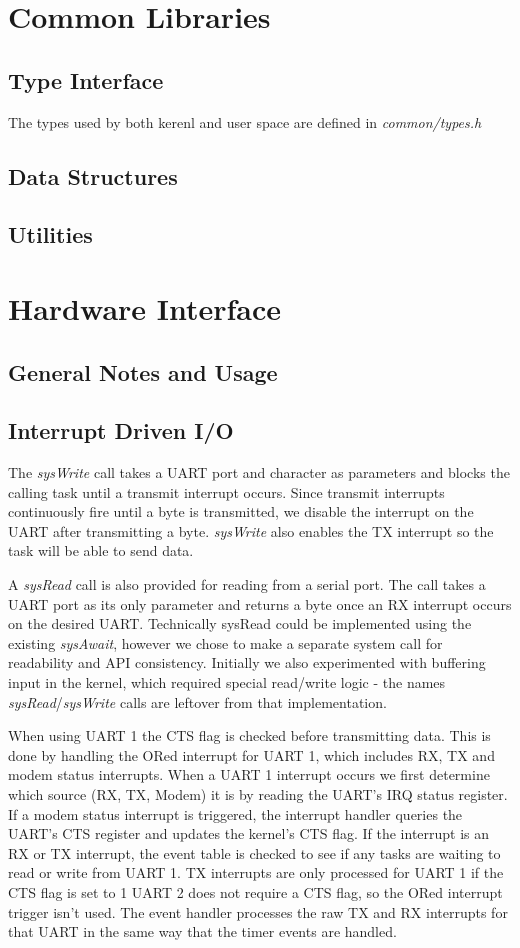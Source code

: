 \documentclass[twoside,a4paper]{refart}
\begin{document}
\section{Common Libraries}
\subsection{Type Interface}
The types used by both kerenl and user space are defined in \textit{common/types.h}
\subsection{Data Structures}
\subsection{Utilities}

\section{Hardware Interface}
\subsection{General Notes and Usage}
\subsection{Interrupt Driven I/O}
The \textit{sysWrite} call takes a UART port and character as parameters and blocks the calling task until a transmit interrupt occurs. Since transmit interrupts continuously fire until a byte is transmitted, we disable the interrupt on the UART after transmitting a byte. \textit{sysWrite} also enables the TX interrupt so the task will be able to send data.

A \textit{sysRead} call is also provided for reading from a serial port. The call takes a UART port as its only parameter and returns a byte once an RX interrupt occurs on the desired UART. Technically sysRead could be implemented using the existing \textit{sysAwait}, however we chose to make a separate system call for readability and API consistency. Initially we also experimented with buffering input in the kernel, which required special read/write logic - the names \textit{sysRead}/\textit{sysWrite} calls are leftover from that implementation.

When using UART 1 the CTS flag is checked before transmitting data. This is done by handling the ORed interrupt for UART 1, which includes RX, TX and modem status interrupts. When a UART 1 interrupt occurs we first determine which source (RX, TX, Modem) it is by reading the UART’s IRQ status register. If a modem status interrupt is triggered, the interrupt handler queries the UART’s CTS register and updates the kernel’s CTS flag. If the interrupt is an RX or TX interrupt, the event table is checked to see if any tasks are waiting to read or write from UART 1. TX interrupts are only processed for UART 1 if the CTS flag is set to 1 UART 2 does not require a CTS flag, so the ORed interrupt trigger isn’t used. The event handler processes the raw TX and RX interrupts for that UART in the same way that the timer events are handled.
\end{document}
